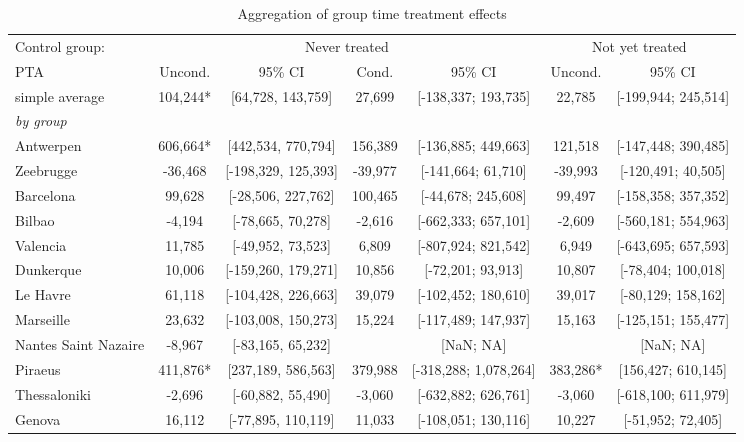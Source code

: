 \begin{table}[ht]
\centering
\caption{Aggregation of group time treatment effects} 
\begingroup\begin{adjustbox}{max width=\textwidth}
\begin{tabular}{lcccccc}
  \hline
\hline
Control group: & \multicolumn{4}{c}{Never treated} & \multicolumn{2}{c}{Not yet treated} \\
 \cmidrule(lr){2-5} \cmidrule(lr){6-7}  PTA & Uncond. & 95\% CI & Cond. & 95\% CI & Uncond. & 95\% CI  \\ 
  \hline
simple average & 104,244* & [64,728, 143,759] &   27,699 & [-138,337; 193,735] &   22,785 & [-199,944; 245,514] \\ 
   [1ex]\emph{by group} &  &  &  &  &  &  \\ 
   \hline
Antwerpen & 606,664* & [442,534, 770,794] &  156,389 & [-136,885; 449,663] &  121,518 & [-147,448; 390,485] \\ 
  Zeebrugge & -36,468 & [-198,329, 125,393] &  -39,977 & [-141,664; 61,710] &  -39,993 & [-120,491; 40,505] \\ 
  Barcelona &  99,628 & [-28,506, 227,762] &  100,465 & [-44,678; 245,608] &   99,497 & [-158,358; 357,352] \\ 
  Bilbao &  -4,194 & [-78,665, 70,278] &   -2,616 & [-662,333; 657,101] &   -2,609 & [-560,181; 554,963] \\ 
  Valencia &  11,785 & [-49,952, 73,523] &    6,809 & [-807,924; 821,542] &    6,949 & [-643,695; 657,593] \\ 
  Dunkerque &  10,006 & [-159,260, 179,271] &   10,856 & [-72,201; 93,913] &   10,807 & [-78,404; 100,018] \\ 
  Le Havre &  61,118 & [-104,428, 226,663] &   39,079 & [-102,452; 180,610] &   39,017 & [-80,129; 158,162] \\ 
  Marseille &  23,632 & [-103,008, 150,273] &   15,224 & [-117,489; 147,937] &   15,163 & [-125,151; 155,477] \\ 
  Nantes Saint Nazaire &  -8,967 & [-83,165, 65,232] &  & [NaN; NA] &  & [NaN; NA] \\ 
  Piraeus & 411,876* & [237,189, 586,563] &  379,988 & [-318,288; 1,078,264] &  383,286* & [156,427; 610,145] \\ 
  Thessaloniki &  -2,696 & [-60,882, 55,490] &   -3,060 & [-632,882; 626,761] &   -3,060 & [-618,100; 611,979] \\ 
  Genova &  16,112 & [-77,895, 110,119] &   11,033 & [-108,051; 130,116] &   10,227 & [-51,952; 72,405] \\ 

\end{tabular}
\end{adjustbox}
\end{table}
